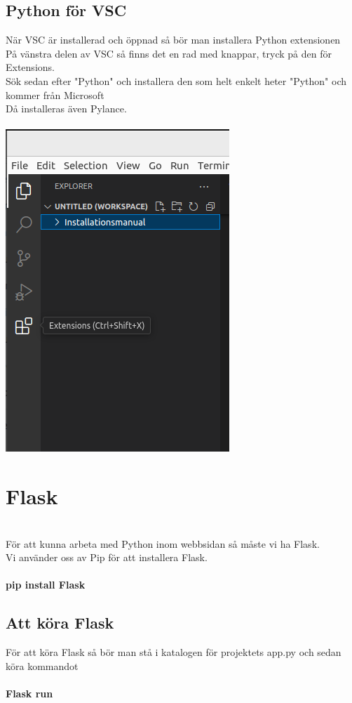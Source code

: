\documentclass{TDP003mall}
\begin{document}
\subsection{Python för VSC}
När VSC är installerad och öppnad så bör man installera Python extensionen\\
På vänstra delen av VSC så finns det en rad med knappar, tryck på den för Extensions.\\
Sök sedan efter "Python" och installera den som helt enkelt heter "Python" och kommer från Microsoft\\
Då installeras även Pylance.\\\\
\includegraphics[scale=0.5]{extensions}


\section{Flask}\\
För att kunna arbeta med Python inom webbsidan så måste vi ha Flask.\\
Vi använder oss av Pip för att installera Flask.\\\\
\textbf{pip install Flask}\\
\subsection{Att köra Flask}
För att köra Flask så bör man stå i katalogen för projektets app.py och sedan köra kommandot\\\\
\textbf{Flask run}
\end{document}
